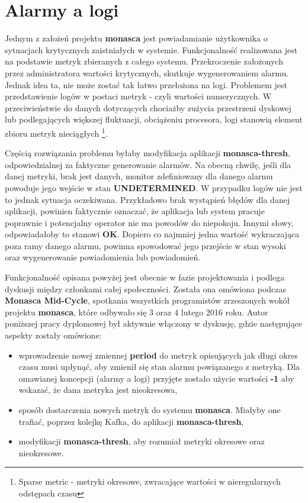 \section{Alarmy a logi}
\label{chapter:application_own:plans:alarm_on_logs}

Jednym z założeń projektu \textbf{monasca} jest powiadamianie użytkownika o 
sytuacjach krytycznych zaistniałych w systemie. Funkcjonalność realizowana jest na podstawie
metryk zbieranych z całego systemu. Przekroczenie założonych przez administratora wartości
krytycznych, skutkuje wygenerowaniem alarmu. Jednak idea ta, nie może zostać
tak łatwo przełożona na logi. Problemem jest przedstawienie logów w postaci metryk - czyli wartości
numerycznych. W przeciwieństwie do danych dotyczących chociażby zużycia przestrzeni dyskowej lub podlegających większej
fluktuacji, obciążeniu procesora, logi stanowią element zbioru metryk nieciągłych \footnote{Sparse metric - metryki okresowe,
zwracające wartości w nieregularnych odstępach czasu}. 

Częścią rozwiązania problemu byłaby modyfikacja aplikacji \textbf{monasca-thresh}, odpowiedzialnej za faktyczne generowanie 
alarmów. Na obecną chwilę, jeśli dla danej metryki, brak jest danych, monitor zdefiniowany dla danego alarmu powoduje jego 
wejście w stan \textbf{UNDETERMINED}. W przypadku logów nie jest to jednak sytuacja oczekiwana. Przykładowo brak wystąpień 
błędów dla danej aplikacji, powinien faktycznie oznaczać, że aplikacja lub system pracuje poprawnie i potencjalny operator nie 
ma powodów do niepokoju. Innymi słowy, odpowiadałoby to stanowi \textbf{OK}. Dopiero co najmniej jedna wartość wykraczająca 
poza ramy danego alarmu, powinna spowodować jego przejście w stan wysoki oraz wygenerowanie powiadomienia lub powiadomień.

Funkcjonalność opisana powyżej jest obecnie w fazie projektowania i podlega dyskusji między członkami całej społeczności.
Została ona omówiona podczas \textbf{Monasca Mid-Cycle}, spotkania wszystkich programistów zrzeszonych wokół projektu
\textbf{monasca}, które odbywało się 3 oraz 4 lutego 2016 roku. Autor poniższej pracy dyplomowej był aktywnie włączony
w dyskusję, gdzie następujące aspekty zostały omówione:
\begin{itemize}
    \item wprowadzenie nowej zmiennej \textbf{period} do metryk opisujących jak długi okres czasu musi upłynąć, aby
    zmienił się stan alarmu powiązanego z metryką. Dla omawianej koncepcji (alarmy a logi) przyjęte zostało użycie wartości
    \textbf{-1} aby wskazać, że dana metryka jest nieokresowa,
    \item sposób dostarczenia nowych metryk do systemu \textbf{monasca}. Miałyby one trafiać, poprzez kolejkę Kafka,
    do aplikacji \textbf{monasca-thresh},
    \item modyfikacji \textbf{monasca-thresh}, aby rozumiał metryki okresowe oraz nieokresowe.
\end{itemize}
